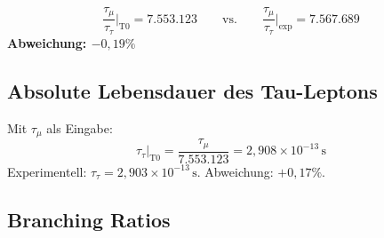 	\begin{keypoint}[Hauptergebnis]
		\begin{equation}
			\frac{\tau_\mu}{\tau_\tau}\bigg|_\text{T0} = 7{.}553{.}123 \qquad \text{vs.} \qquad \frac{\tau_\mu}{\tau_\tau}\bigg|_\text{exp} = 7{.}567{.}689
		\end{equation}
		\textbf{Abweichung: $-0{,}19\%$}
	\end{keypoint}
	
	\subsection{Absolute Lebensdauer des Tau-Leptons}
	
	Mit $\tau_\mu$ als Eingabe:
	\begin{equation}
		\tau_\tau\big|_\text{T0} = \frac{\tau_\mu}{7{.}553{.}123} = 2{,}908 \times 10^{-13} \, \text{s}
	\end{equation}
	Experimentell: $\tau_\tau = 2{,}903 \times 10^{-13} \, \text{s}$. Abweichung: $+0{,}17\%$.
	
	\subsection{Branching Ratios}
	
	\begin{table}[h]
		\centering
		\caption{Vergleich T0-Vorhersage mit experimentellen Werten. $\alpha_s$ aus T0-Geometrie.}
		\label{tab:results}
	\end{table}
	
